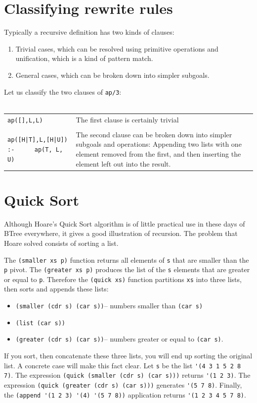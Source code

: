 \documentclass[a4paper,12pt]{book}
\begin{document}
\section{Classifying rewrite rules}
Typically a recursive definition has two kinds of clauses:
\begin{enumerate}
\item Trivial cases, which can be  
resolved using primitive operations and unification, which is
a kind of pattern match.
\item General cases, which can be  
broken down into simpler subgoals.
\end{enumerate}
Let us classify the two clauses of \verb|ap/3|:\\

\verb||\\
\begin{tabular}{p{5cm}p{7cm}}
\verb|ap([],L,L) | & The first clause is certainly trivial\\
\\
\verb/ap([H|T],L,[H|U])/ \verb/:- /
\verb/    ap(T, L, U)/
& The second clause can be
broken down into simpler
subgoals and operations: Appending two
lists with one element
removed from the first,
and then inserting the element
left out into the result.\\
\end{tabular}


\section{Quick Sort}
Although Hoare's Quick Sort algorithm is
of little practical use in these days of BTree everywhere, it gives a good illustration
of recursion. The problem that Hoare solved consists of sorting a list.

The \verb|(smaller xs p)| function returns
all elements of \verb|s| that are smaller
than the \verb|p| pivot. 
The \verb|(greater xs p)| produces the
list of the \verb|s| elements that are
greater or equal to \verb|p|. Therefore the
\verb|(quick xs)| function partitions 
\verb|xs| into three lists, then sorts
and appends these lists:
\begin{itemize}
\item \verb|(smaller (cdr s) (car s))|--
numbers smaller than \verb|(car s)|
\item \verb|(list (car s))| 
\item \verb|(greater (cdr s) (car s))|--
numbers greater or equal to \verb|(car s)|.
\end{itemize}
If you sort, then concatenate these three lists,
you will end up sorting the original list.
A concrete case will make this fact clear.
Let \verb|s| be the list \verb|'(4 3 1 5 2 8 7)|.
The expression
\verb|(quick (smaller (cdr s) (car s)))|
returns \verb|'(1 2 3)|.
The expression
\verb|(quick (greater (cdr s) (car s)))|
generates \verb|'(5 7 8)|. Finally, 
the 
\verb|(append '(1 2 3) '(4) '(5 7 8))|
application
returns \verb|'(1 2 3 4 5 7 8)|.
\end{document}
